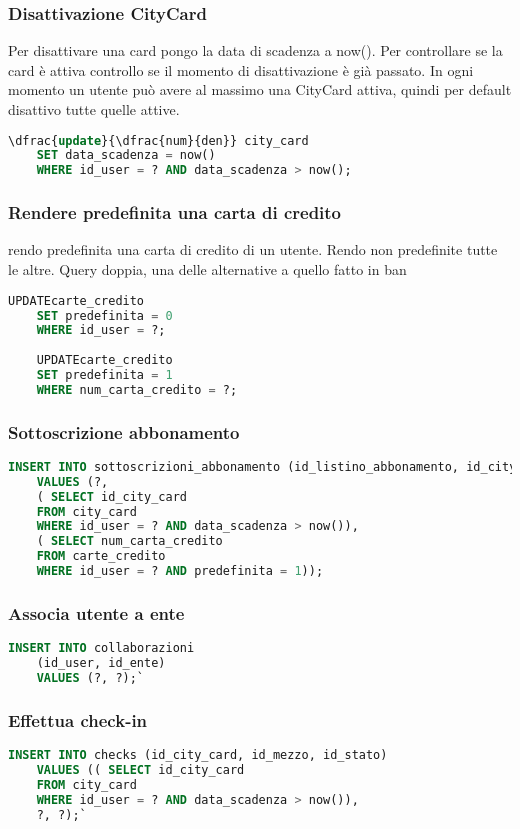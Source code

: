 \subsubsection{Disattivazione CityCard}
Per disattivare una card pongo la data di scadenza a now().
Per controllare se la card è attiva controllo se il momento di disattivazione è già passato.
In ogni momento un utente può avere al massimo una CityCard attiva,
quindi per default disattivo tutte quelle attive.
\begin{lstlisting}[language=SQL]
	\dfrac{update}{\dfrac{num}{den}} city_card
	SET data_scadenza = now()
	WHERE id_user = ? AND data_scadenza > now();
\end{lstlisting}

\subsubsection{Rendere predefinita una carta di credito}
rendo predefinita una carta di credito di un utente. Rendo non predefinite tutte le altre. Query doppia, una delle alternative a quello fatto in ban
\begin{lstlisting}[language=SQL]
	UPDATEcarte_credito
	SET predefinita = 0
	WHERE id_user = ?;
	
	UPDATEcarte_credito
	SET predefinita = 1
	WHERE num_carta_credito = ?;
\end{lstlisting}

\subsubsection{Sottoscrizione abbonamento}
\begin{lstlisting}[language=SQL]
	INSERT INTO sottoscrizioni_abbonamento (id_listino_abbonamento, id_city_card, num_carta_credito) 
	VALUES (?, 
	( SELECT id_city_card
	FROM city_card
	WHERE id_user = ? AND data_scadenza > now()), 
	( SELECT num_carta_credito 
	FROM carte_credito
	WHERE id_user = ? AND predefinita = 1));
\end{lstlisting}

\subsubsection{Associa utente a ente}
\begin{lstlisting}[language=SQL]
	INSERT INTO collaborazioni 
	(id_user, id_ente) 
	VALUES (?, ?);`
\end{lstlisting}

\subsubsection{Effettua check-in}
\begin{lstlisting}[language=SQL]
	INSERT INTO checks (id_city_card, id_mezzo, id_stato) 
	VALUES (( SELECT id_city_card
	FROM city_card
	WHERE id_user = ? AND data_scadenza > now()), 
	?, ?);`
\end{lstlisting}

